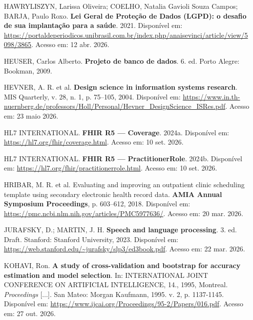 \documentclass[12pt,a4paper]{extarticle}
\begin{document}
\vspace{0.5cm}\noindent
HAWRYLISZYN, Larissa Oliveira; COELHO, Natalia Gavioli Souza Campos; BARJA, Paulo Roxo. \textbf{Lei Geral de Proteção de Dados (LGPD): o desafio de sua implantação para a saúde}. 2021. Disponível em: \url{https://portaldeperiodicos.unibrasil.com.br/index.php/anaisevinci/article/view/5098/3865}. Acesso em: 12 abr. 2026.

\vspace{0.5cm}\noindent
HEUSER, Carlos Alberto. \textbf{Projeto de banco de dados}. 6. ed. Porto Alegre: Bookman, 2009.

\vspace{0.5cm}\noindent
HEVNER, A. R. et al. \textbf{Design science in information systems research}. MIS Quarterly, v. 28, n. 1, p. 75–105, 2004. Disponível em: \url{https://www.in.th-nuernberg.de/professors/Holl/Personal/Hevner_DesignScience_ISRes.pdf}. Acesso em: 23 maio 2026.

\vspace{0.5cm}\noindent
HL7 INTERNATIONAL. \textbf{FHIR R5 — Coverage}. 2024a. Disponível em: \url{https://hl7.org/fhir/coverage.html}. Acesso em: 10 set. 2026.

\vspace{0.5cm}\noindent
HL7 INTERNATIONAL. \textbf{FHIR R5 — PractitionerRole}. 2024b. Disponível em: \url{https://hl7.org/fhir/practitionerrole.html}. Acesso em: 10 set. 2026.

\vspace{0.5cm}\noindent
HRIBAR, M. R. et al. Evaluating and improving an outpatient clinic scheduling template using secondary electronic health record data. \textbf{AMIA Annual Symposium Proceedings}, p. 603--612, 2018. Disponível em: \url{https://pmc.ncbi.nlm.nih.gov/articles/PMC5977636/}. Acesso em: 20 mar. 2026.

\vspace{0.5cm}\noindent
JURAFSKY, D.; MARTIN, J. H. \textbf{Speech and language processing}. 3. ed. Draft. Stanford: Stanford University, 2023. Disponível em: \url{https://web.stanford.edu/~jurafsky/slp3/ed3book.pdf}. Acesso em: 22 mar. 2026.

\vspace{0.5cm}\noindent
KOHAVI, Ron. \textbf{A study of cross-validation and bootstrap for accuracy estimation and model selection}. In: INTERNATIONAL JOINT CONFERENCE ON ARTIFICIAL INTELLIGENCE, 14., 1995, Montreal. \textit{Proceedings} [...]. San Mateo: Morgan Kaufmann, 1995. v. 2, p. 1137-1145. Disponível em: \url{https://www.ijcai.org/Proceedings/95-2/Papers/016.pdf}. Acesso em: 27 out. 2026.
\end{document}
